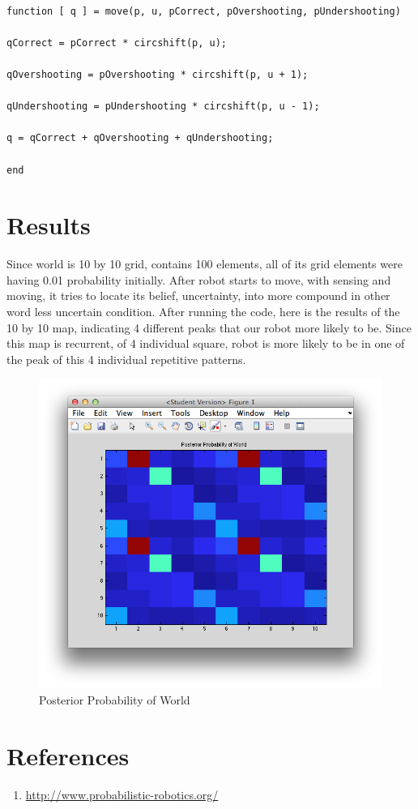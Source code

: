 \documentclass{article}
\begin{document}
\begin{lstlisting}[label=move-m, caption=move.m]
	
function [ q ] = move(p, u, pCorrect, pOvershooting, pUndershooting)

qCorrect = pCorrect * circshift(p, u);

qOvershooting = pOvershooting * circshift(p, u + 1);

qUndershooting = pUndershooting * circshift(p, u - 1);

q = qCorrect + qOvershooting + qUndershooting;

end

\end{lstlisting}


\section{Results}

Since world is 10 by 10 grid, contains 100 elements, all of its grid elements were having 0.01 probability initially. After robot starts to move, with sensing and moving, it tries to locate its belief, uncertainty, into more compound in other word less uncertain condition. After running the code, here is the results of the 10 by 10 map, indicating 4 different peaks that our robot more likely to be. Since this map is recurrent, of 4 individual square, robot is more likely to be in one of the peak of this 4 individual repetitive patterns. 

\begin{figure}[H]
\begin{center}
\includegraphics[scale=0.6]{2DLocalizationResult.png}
\caption{Posterior Probability of World}
\end{center}
\end{figure}	


\section{References}
\begin{enumerate}
	\item \href{url}{http://www.probabilistic-robotics.org/}
\end{enumerate}
\end{document}
